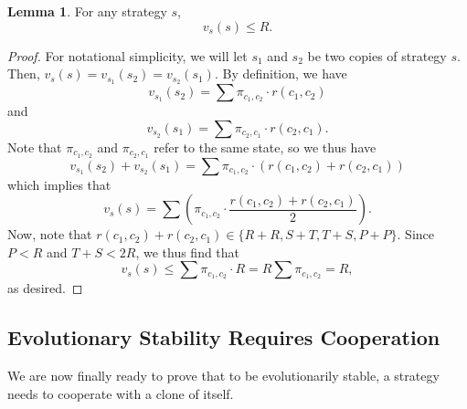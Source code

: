 \documentclass[12pt]{article}
\theoremstyle{definition}
\newtheorem{lemma}[theorem]{Lemma}
\theoremstyle{remark}
\begin{document}
\begin{lemma}
  \label{neverbetterthanr}
  For any strategy $s$,
  \begin{equation*}
    v_{s}(s) \leq R.
  \end{equation*}
\end{lemma}
\begin{proof}
  For notational simplicity, we will let $s_1$ and $s_2$ be two copies of strategy $s$. Then, $v_{s}(s) = v_{s_1}(s_2) = v_{s_2}(s_1)$. By definition, we have
  \begin{equation*}
    v_{s_1}(s_2) = \sum \pi_{c_1,c_2} \cdot r(c_1, c_2)
  \end{equation*}
  and
  \begin{equation*}
    v_{s_2}(s_1) = \sum \pi_{c_2,c_1} \cdot r(c_2, c_1).
  \end{equation*}
  Note that $\pi_{c_1,c_2}$ and $\pi_{c_2,c_1}$ refer to the same state, so we thus have \begin{equation*}
    v_{s_1}(s_2) + v_{s_2}(s_1) = \sum \pi_{c_1,c_2} \cdot (r(c_1,c_2) + r(c_2,c_1))
  \end{equation*}
  which implies that \begin{equation*}
    v_s(s) = \sum \left( \pi_{c_1,c_2} \cdot \frac{r(c_1,c_2) + r(c_2,c_1)}{2} \right).
  \end{equation*}
  Now, note that $r(c_1,c_2) + r(c_2,c_1) \in \{R + R, S + T, T+S, P + P\}$. Since $P < R$ and $T + S < 2R$, we thus find that \begin{equation*}
    v_s(s) \leq \sum \pi_{c_1,c_2} \cdot R = R \sum \pi_{c_1,c_2} = R,
  \end{equation*}
  as desired.
\end{proof}

\subsection{Evolutionary Stability Requires Cooperation}

  We are now finally ready to prove that to be evolutionarily stable, a strategy needs to cooperate with a clone of itself.
\end{document}
